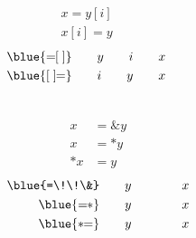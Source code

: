 \begin{frame}{}
  \begin{center}
    \begin{columns}
        \begin{align*}
          x = y[i] \\
          x[i] = y
        \end{align*}
        \begin{align*}
          \blue{=\!\![\;]} \qquad y \qquad i \qquad x \\
          \blue{[\;]\!\!=} \qquad i \qquad y \qquad x
        \end{align*}
    \end{columns}

    \pause
    \vspace{0.80cm}
    \begin{columns}
        \begin{align*}
          x &= \&y \\
          x &= \ast y \\
          \ast x &= y
        \end{align*}
        \begin{align*}
          \blue{=\!\!\&} \qquad y \qquad \qquad x \\
          \blue{=\!\!\ast} \qquad y \qquad \qquad x \\
          \blue{\ast\!\!=} \qquad y \qquad \qquad x
        \end{align*}
    \end{columns}
  \end{center}
\end{frame}
